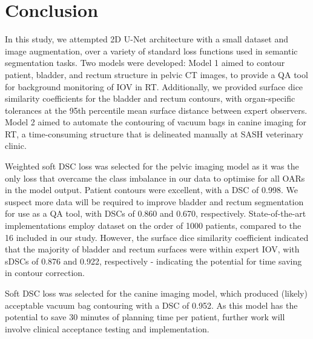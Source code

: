 \chapter{Conclusion}
\label{ch:conclusion}

In this study, we attempted 2D U-Net architecture with a small dataset and image augmentation, over a variety of standard loss functions used in semantic segmentation tasks. Two models were developed: Model 1 aimed to contour patient, bladder, and rectum structure in pelvic CT images, to provide a QA tool for background monitoring of IOV in RT. Additionally, we provided surface dice similarity coefficients for the bladder and rectum contours, with organ-specific tolerances at the 95th percentile mean surface distance between expert observers. Model 2 aimed to automate the contouring of vacuum bags in canine imaging for RT, a time-consuming structure that is delineated manually at SASH veterinary clinic.

Weighted soft DSC loss was selected for the pelvic imaging model as it was the only loss that overcame the class imbalance in our data to optimise for all OARs in the model output. Patient contours were excellent,
with a DSC of 0.998. We suspect more data will be required to improve bladder and rectum segmentation for use as a QA tool, with DSCs of 0.860 and 0.670, respectively. State-of-the-art implementations employ dataset on the order of 1000 patients, compared to the 16 included in our study. However, the surface dice similarity coefficient indicated that the majority of bladder and rectum surfaces were within expert IOV, with sDSCs of 0.876 and 0.922, respectively - indicating the potential for time saving in contour correction.

Soft DSC loss was selected for the canine imaging model, which produced (likely)
acceptable vacuum bag contouring with a DSC of 0.952. As this model has the potential to save 30 minutes of planning time per patient, further work will involve clinical acceptance testing and implementation.


